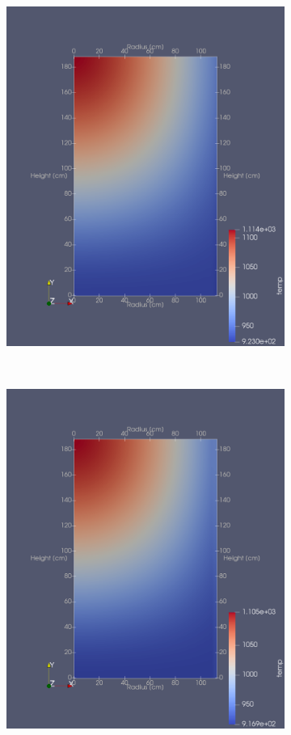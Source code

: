 \documentclass{anstrans}
\begin{document}
{\begin{figure}
\begin{subfigure}{1\columnwidth}
\includegraphics[width=\columnwidth]{./figures/eltemp}%
\end{subfigure}\hfill\\
\bigskip
\centering
\begin{subfigure}{1\columnwidth}
\includegraphics[width=\columnwidth]{./figures/eqtemp}%

\end{subfigure}
\end{figure}}
\end{document}
